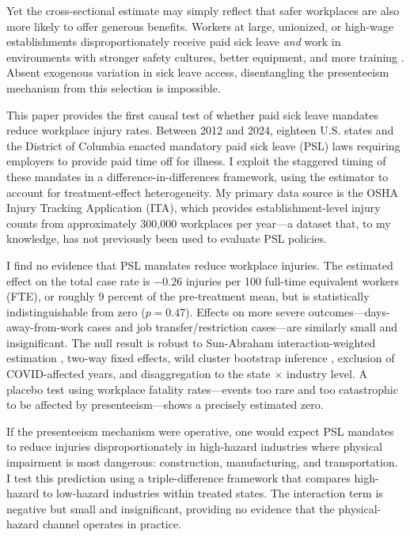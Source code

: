 \documentclass[12pt]{article}
\begin{document}
Yet the cross-sectional estimate may simply reflect that safer workplaces are also more likely to offer generous benefits. Workers at large, unionized, or high-wage establishments disproportionately receive paid sick leave \textit{and} work in environments with stronger safety cultures, better equipment, and more training \citep{lovell2004, drago2011}. Absent exogenous variation in sick leave access, disentangling the presenteeism mechanism from this selection is impossible.

This paper provides the first causal test of whether paid sick leave mandates reduce workplace injury rates. Between 2012 and 2024, eighteen U.S. states and the District of Columbia enacted mandatory paid sick leave (PSL) laws requiring employers to provide paid time off for illness. I exploit the staggered timing of these mandates in a difference-in-differences framework, using the \citet{callaway2021} estimator to account for treatment-effect heterogeneity. My primary data source is the OSHA Injury Tracking Application (ITA), which provides establishment-level injury counts from approximately 300,000 workplaces per year---a dataset that, to my knowledge, has not previously been used to evaluate PSL policies.

I find no evidence that PSL mandates reduce workplace injuries. The estimated effect on the total case rate is $-0.26$ injuries per 100 full-time equivalent workers (FTE), or roughly 9 percent of the pre-treatment mean, but is statistically indistinguishable from zero ($p = 0.47$). Effects on more severe outcomes---days-away-from-work cases and job transfer/restriction cases---are similarly small and insignificant. The null result is robust to Sun-Abraham interaction-weighted estimation \citep{sun2021}, two-way fixed effects, wild cluster bootstrap inference \citep{cameron2008}, exclusion of COVID-affected years, and disaggregation to the state $\times$ industry level. A placebo test using workplace fatality rates---events too rare and too catastrophic to be affected by presenteeism---shows a precisely estimated zero.

If the presenteeism mechanism were operative, one would expect PSL mandates to reduce injuries disproportionately in high-hazard industries where physical impairment is most dangerous: construction, manufacturing, and transportation. I test this prediction using a triple-difference framework that compares high-hazard to low-hazard industries within treated states. The interaction term is negative but small and insignificant, providing no evidence that the physical-hazard channel operates in practice.
\end{document}
